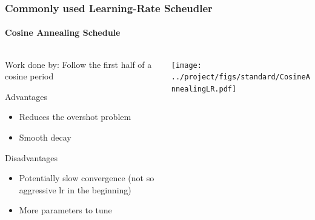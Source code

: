 \documentclass[10pt,aspectratio=169]{beamer}
\begin{document}
    
    \begin{frame}
        \frametitle{Commonly used Learning-Rate Scheudler}        
        \framesubtitle{Cosine Annealing Schedule}
        
        \begin{columns}
            \begin{column}{0.5\textwidth}
                Work done by: \cite{loshchilov2016sgdr}
                Follow the first half  of a cosine period 
                \vspace{0.5cm}

                Advantages
                \begin{itemize}
                    \item Reduces the overshot problem
                    \item Smooth decay 
                \end{itemize}

                Disadvantages
                \begin{itemize}
                    \item Potentially slow convergence (not so aggressive lr in the beginning)
                    \item More parameters to tune
                \end{itemize}
            \end{column}
            \begin{column}{0.5\textwidth}
                \texttt{[image: ../project/figs/standard/CosineAnnealingLR.pdf]}
            \end{column}
        \end{columns}
    \end{frame}
\end{document}

